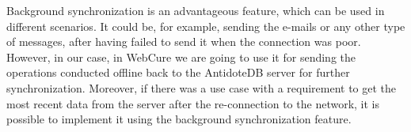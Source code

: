 Background synchronization is an advantageous feature, which can be used in different scenarios. It could be, for example, sending the e-mails or any other type of messages, after having failed to send it when the connection was poor. However, in our case, in WebCure we are going to use it for sending the operations conducted offline back to the AntidoteDB server for further synchronization. Moreover, if there was a use case with a requirement to get the most recent data from the server after the re-connection to the network, it is possible to implement it using the background synchronization feature.
